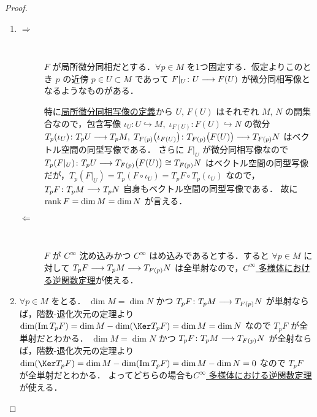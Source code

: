 \documentclass[geometry_main]{subfiles}
\begin{document}
\begin{proof}
    \begin{enumerate}
        \item \begin{description}
            \item[\textbf{$\bm{\Longrightarrow}$}]　
            
            $F$ が局所微分同相だとする．$\forall p \in M$ を1つ固定する．仮定よりこのとき $p$ の近傍 $p \in U \subset M$ であって $F|_U \colon U \longrightarrow F(U)$ が微分同相写像となるようなものがある．

            特に\hyperref[def:loc-diffeo]{局所微分同相写像の定義}から $U,\, F(U)$ はそれぞれ $M,\, N$ の開集合なので，包含写像 $\iota_U \colon U \hookrightarrow M,\; \iota_{F(U)} \colon F(U) \hookrightarrow N$ の微分 $T_p (\iota_U) \colon T_p U \longrightarrow T_p M,\; T_{F(p)} \bigl( \iota_{F(U)} \bigr) \colon T_{F(p)} \bigl( F(U) \bigr) \longrightarrow T_{F(p)} N$ はベクトル空間の同型写像である．
            さらに $F|_U$ が微分同相写像なので $T_p (F|_U) \colon T_p U \longrightarrow T_{F(p)} \bigl( F(U) \bigr) \cong T_{F(p)} N$ はベクトル空間の同型写像だが，$T_p (F|_U) = T_p (F \circ \iota_U) = T_p F \circ T_p (\iota_U)$ なので，$T_p F \colon T_p M \longrightarrow T_p N$ 自身もベクトル空間の同型写像である．
            故に $\rank F = \dim M = \dim N$ が言える．
            \item[\textbf{$\bm{\Longleftarrow}$}]　
            
            $F$ が $C^\infty$ 沈め込みかつ $C^\infty$ はめ込みであるとする．すると $\forall p \in M$ に対して $T_p F \longrightarrow T_p M \longrightarrow T_{F(p)} N$ は全単射なので，\hyperref[thm:inverse-function-b]{$C^\infty$ 多様体における逆関数定理}が使える．
        \end{description}
        \item $\forall p \in M$ をとる．
        $\dim M = \dim N$ かつ $T_p F \colon T_p M \longrightarrow T_{F(p)}N$ が単射ならば，階数-退化次元の定理より $\dim (\Im T_p F) = \dim M - \dim (\Ker T_p F) = \dim M = \dim N$ なので $T_p F$ が全単射だとわかる．
        $\dim M = \dim N$ かつ $T_p F \colon T_p M \longrightarrow T_{F(p)}N$ が全射ならば，階数-退化次元の定理より $\dim (\Ker T_p F) = \dim M - \dim (\Im T_p F) = \dim M - \dim N = 0$ なので $T_p F$ が全単射だとわかる．
        よってどちらの場合も\hyperref[thm:inverse-function-b]{$C^\infty$ 多様体における逆関数定理}が使える．
    \end{enumerate}
\end{proof}
\end{document}
